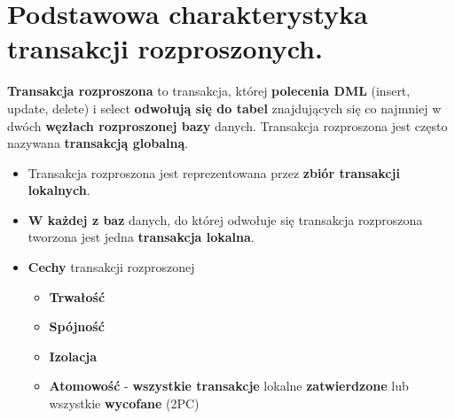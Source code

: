 \documentclass[a4paper]{article}
\begin{document}
    \section{Podstawowa charakterystyka transakcji rozproszonych.}

    \textbf{Transakcja rozproszona} to transakcja, której \textbf{polecenia DML} (insert, update, delete) i select
    \textbf{odwołują się do tabel} znajdujących się co najmniej w dwóch \textbf{węzłach rozproszonej bazy} danych.
    Transakcja rozproszona jest często nazywana \textbf{transakcją globalną}.
    \begin{itemize}[noitemsep]
        \item Transakcja rozproszona jest reprezentowana przez \textbf{zbiór transakcji lokalnych}.
        \item \textbf{W każdej z baz} danych, do której odwołuje się transakcja rozproszona tworzona jest jedna
        \textbf{transakcja lokalna}.
        \item \textbf{Cechy} transakcji rozproszonej
        \begin{itemize}[noitemsep]
            \item \textbf{Trwałość}
            \item \textbf{Spójność}
            \item \textbf{Izolacja}
            \item \textbf{Atomowość} - \textbf{wszystkie transakcje} lokalne \textbf{zatwierdzone} lub wszystkie
            \textbf{wycofane} (2PC)
        \end{itemize}
    \end{itemize}
\end{document}
